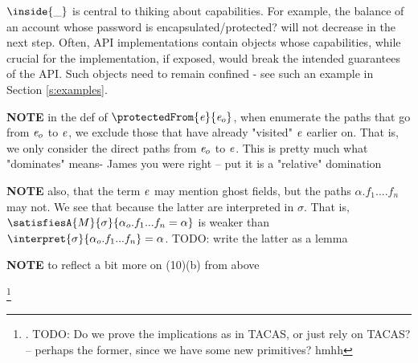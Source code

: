 ${\inside {\_}}$  is central to thiking about capabilities. For example, the balance of an account whose
  password is  encapsulated/protected?  will not decrease in the next step.
  Often, API implementations contain objects whose capabilities, while  crucial for the implementation, if exposed,
would break the intended guarantees of the API. Such objects need to remain confined - see
such an example in Section \ref{s:examples}. 

{\textbf{NOTE} in the def of  $\protectedFrom{\re}{\re_o}$, when enumerate the paths that go from $\mathit{e}_o$ to $\mathit{e}$, we exclude those that have already "visited" $\mathit{e}$ earlier on. That is, we only consider the direct paths from $\mathit{e}_o$ to $\mathit{e}$. This is pretty much what "dominates" means- James you were right -- put it is a "relative" domination}

{\textbf{NOTE} also, that the term $\mathit{e}$ may mention ghost fields, but the paths $\alpha.f_1....f_n$ may not. We see that because the latter are interpreted in $\sigma$. That is, $\satisfiesA{M}{\sigma}{{\alpha_o.f_1...f_n}=\alpha}$ is weaker than $\interpret{\sigma}{\alpha_{o}.f_1...f_n}=\alpha$. TODO: write the latter as a lemma}

{\textbf{NOTE} to reflect a bit more on (10)(b) from above}
 
\footnote{{. TODO: Do we prove the implications as in TACAS, or just rely on TACAS? -- perhaps the former, since we have some new primitives? hmhh}}

